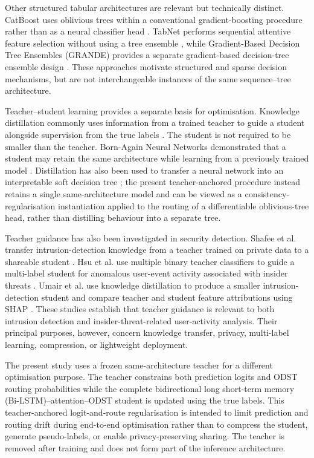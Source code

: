 \smallskip
Other structured tabular architectures are relevant but technically
distinct. CatBoost uses oblivious trees within a conventional
gradient-boosting procedure rather than as a neural classifier head
\cite{Prokhorenkova2018CatBoost}. TabNet performs sequential attentive
feature selection without using a tree ensemble
\cite{ArikPfister2021TabNet}, while Gradient-Based Decision Tree Ensembles (GRANDE) provides a separate
gradient-based decision-tree ensemble design
\cite{Marton2024GRANDE}. These approaches motivate structured and sparse
decision mechanisms, but are not interchangeable instances of the same
sequence--tree architecture.

\smallskip
Teacher--student learning provides a separate basis for optimisation.
Knowledge distillation commonly uses information from a trained teacher to
guide a student alongside supervision from the true labels
\cite{Hinton2015Distillation,Gou2021KDSurvey}. The student is not required
to be smaller than the teacher. Born-Again Neural Networks demonstrated
that a student may retain the same architecture while learning from a
previously trained model \cite{Furlanello2018BornAgain}. Distillation has
also been used to transfer a neural network into an interpretable soft
decision tree \cite{FrosstHinton2017SoftTree}; the present teacher-anchored
procedure instead retains a single same-architecture model and can be viewed
as a consistency-regularisation instantiation applied to the routing of a
differentiable oblivious-tree head, rather than distilling behaviour into a
separate tree.

\smallskip
Teacher guidance has also been investigated in security detection. Shafee
et al. transfer intrusion-detection knowledge from a teacher trained on
private data to a shareable student
\cite{Shafee2020Mimic}. Hsu et al. use multiple binary teacher classifiers
to guide a multi-label student for anomalous user-event activity associated
with insider threats \cite{Hsu2023TeacherStudent}. Umair et al. use
knowledge distillation to produce a smaller intrusion-detection student and
compare teacher and student feature attributions using SHAP
\cite{Umair2025KDIDS}. These studies establish that teacher guidance is
relevant to both intrusion detection and insider-threat-related
user-activity analysis. Their principal purposes, however, concern
knowledge transfer, privacy, multi-label learning, compression, or
lightweight deployment.

\smallskip
The present study uses a frozen same-architecture teacher for a different
optimisation purpose. The teacher constrains both prediction logits and
ODST routing probabilities while the complete bidirectional long short-term
memory (Bi-LSTM)--attention--ODST student is updated using the true labels.
This teacher-anchored logit-and-route regularisation is intended to limit
prediction and routing drift during end-to-end optimisation rather than to
compress the student, generate pseudo-labels, or enable
privacy-preserving sharing. The teacher is removed after training and does
not form part of the inference architecture.

